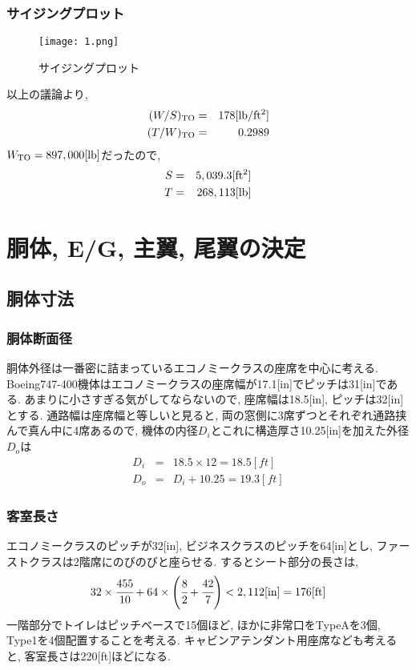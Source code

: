 \documentclass[12pt]{jsarticle}
\begin{document}
\subsubsection{サイジングプロット}
\begin{figure}[H]
\begin{center}
\texttt{[image: 1.png]}
\caption{サイジングプロット}
\end{center}
\end{figure}
以上の議論より, 
\begin{eqnarray*}
(W/S)_{\rm TO} &=& 178 [{\rm lb/ft^2} ] \\
(T/W)_{\rm TO} &=& 0.2989
\end{eqnarray*}
$W_{\rm TO} = 897,000 [{\rm lb}]$だったので, 
\begin{eqnarray*}
S &=& 5,039.3 [{\rm ft^2} ] \\
T &=& 268,113 [{\rm lb}]
\end{eqnarray*}

\section{胴体, E/G, 主翼, 尾翼の決定}
\subsection{胴体寸法}
\subsubsection{胴体断面径}
胴体外径は一番密に詰まっているエコノミークラスの座席を中心に考える. Boeing747-400機体はエコノミークラスの座席幅が17.1[in]でピッチは31[in]である. あまりに小さすぎる気がしてならないので, 座席幅は18.5[in], ピッチは32[in]とする. 通路幅は座席幅と等しいと見ると, 両の窓側に3席ずつとそれぞれ通路挟んで真ん中に4席あるので, 機体の内径$D_i$とこれに構造厚さ10.25[in]を加えた外径$D_o$は
\begin{eqnarray*}
D_i &=& 18.5 \times 12 = 18.5 [ft] \\
D_o &=& D_i + 10.25 = 19.3 [ft]
\end{eqnarray*}

\subsubsection{客室長さ}
エコノミークラスのピッチが32[in], ビジネスクラスのピッチを64[in]とし, ファーストクラスは2階席にのびのびと座らせる. するとシート部分の長さは,
\begin{eqnarray*}
32 \times \cfrac{455}{10} + 64 \times \left(\cfrac{8}{2} + \cfrac{42}{7} \right) < 2,112 [\rm in] = 176 [\rm ft]
\end{eqnarray*}
一階部分でトイレはピッチベースで15個ほど, ほかに非常口をTypeAを3個, Type1を4個配置することを考える. キャビンアテンダント用座席なども考えると, 客室長さは220[ft]ほどになる.
\end{document}
